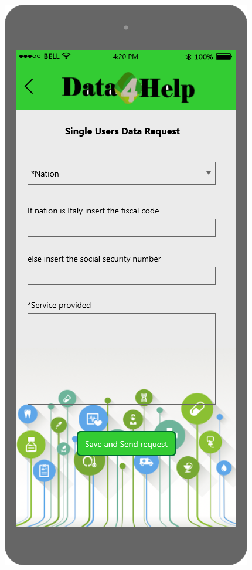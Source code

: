\vspace{7cm}
   
\begin{figure}[h!]
	\centering
 	 \begin{minipage}[b]{0.25\textwidth}
    		\includegraphics[width=\textwidth]{./pictures/single_user_request.png}

\end{minipage}
\end{figure}
